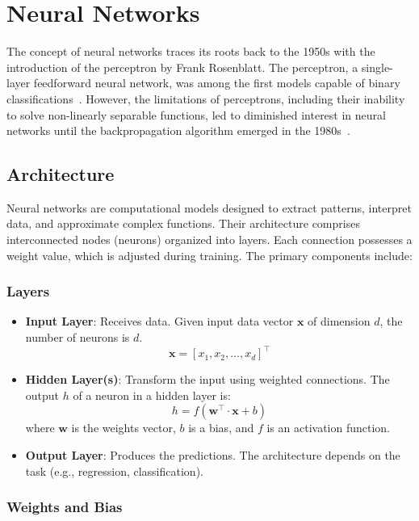 \section{Neural Networks}
The concept of neural networks traces its roots back to the 1950s with the introduction of the perceptron by Frank Rosenblatt. The perceptron, a single-layer feedforward neural network, was among the first models capable of binary classifications~\cite{rosenblatt1958perceptron}. However, the limitations of perceptrons, including their inability to solve non-linearly separable functions, led to diminished interest in neural networks until the backpropagation algorithm emerged in the 1980s~\cite{rumelhart1986learning}.

\subsection{Architecture}

Neural networks are computational models designed to extract patterns, interpret data, and approximate complex functions. Their architecture comprises interconnected nodes (neurons) organized into layers. Each connection possesses a weight value, which is adjusted during training. The primary components include:

\subsubsection{Layers}

\begin{itemize}
	\item \textbf{Input Layer}: Receives data. Given input data vector \( \mathbf{x} \) of dimension \( d \), the number of neurons is \( d \).
	\[
	\mathbf{x} = [x_1, x_2, ..., x_d]^\intercal
	\]
	
	\item \textbf{Hidden Layer(s)}: Transform the input using weighted connections. The output \( h \) of a neuron in a hidden layer is:
	\[
	h = f(\mathbf{w^\intercal} \cdot \mathbf{x} + b)
	\]
	where \( \mathbf{w} \) is the weights vector, \( b \) is a bias, and \( f \) is an activation function.
	
	\item \textbf{Output Layer}: Produces the predictions. The architecture depends on the task (e.g., regression, classification).
\end{itemize}

\subsubsection{Weights and Bias}

